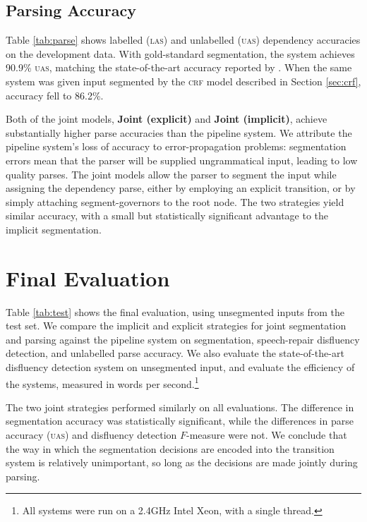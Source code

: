 \documentclass[11pt,letterpaper]{article}
\begin{document}
\subsection{Parsing Accuracy}


Table \ref{tab:parse} shows labelled (\textsc{las}) and unlabelled
(\textsc{uas}) dependency accuracies on the development data.  With gold-standard
segmentation, the system achieves 90.9\%
\textsc{uas}, matching the state-of-the-art accuracy
reported by \citet{honnibal:14}.
When the same system was given input segmented by the \textsc{crf} model
described in Section \ref{sec:crf}, accuracy fell to 86.2\%.

Both of the joint models, \textbf{Joint (explicit)} and \textbf{Joint (implicit)},
achieve substantially higher parse accuracies than the pipeline system.
We attribute the pipeline system's loss of accuracy to error-propagation problems:
segmentation errors mean that the parser will be supplied ungrammatical input,
leading to low quality parses.
The joint models allow the parser to segment the input while assigning the
dependency parse, either by employing an explicit transition, or by simply
attaching segment-governors to the root node.  The two strategies yield similar
accuracy, with a small but statistically significant advantage to the implicit
segmentation.

\section{Final Evaluation}

Table \ref{tab:test} shows the final evaluation, using unsegmented inputs from
the test set.  We compare the implicit and explicit strategies for joint
segmentation and parsing against the pipeline system on segmentation,
speech-repair disfluency detection, and unlabelled parse accuracy.  
We also evaluate the state-of-the-art \citet{qian:13} disfluency detection system
on unsegmented input, and evaluate the efficiency of the systems, measured in
words per second.\footnote{All systems were run on a 2.4GHz Intel Xeon, with a
single thread.}

The two joint strategies performed similarly on all evaluations.
The difference in segmentation accuracy was statistically significant, while
the differences in parse accuracy (\textsc{uas}) and disfluency detection $F$-measure
were not.
We conclude that the way in which the segmentation decisions are encoded into the transition
system is relatively unimportant, so long as the decisions are made jointly during
parsing.
\end{document}
